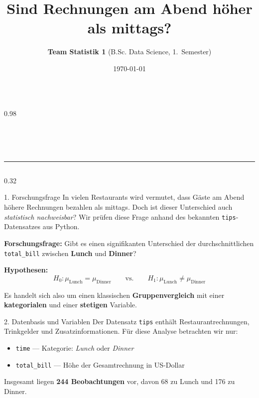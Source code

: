 \documentclass[final]{beamer}
\title{\bfseries Sind Rechnungen am Abend höher als mittags?}
\author{\textbf{Team Statistik 1} (B.Sc. Data Science, 1.\ Semester)}
\institute{\textbf{Technische Hochschule Ingolstadt – Fakultät Wirtschaftsingenieurwesen}}
\date{\today}
\newcommand{\smallgap}{\vspace{0.6cm}}
\begin{document}
\begin{frame}[t]

\begin{columns}[T]
  \begin{column}{0.98\textwidth}
    \vskip1cm
    \begin{center}
      {\Huge\inserttitle}\\[0.6cm]
      {\Large\insertauthor}\\[0.25cm]
      {\large\insertinstitute}\\[0.6cm]
      \rule{\textwidth}{1pt}
    \end{center}
  \end{column}
\end{columns}

\vspace{1cm}

\begin{columns}[T,totalwidth=\textwidth]

\begin{column}{0.32\textwidth}
  \begin{block}{1. Forschungsfrage}
    In vielen Restaurants wird vermutet, dass Gäste am Abend höhere Rechnungen bezahlen als mittags.  
    Doch ist dieser Unterschied auch \emph{statistisch nachweisbar}?  
    Wir prüfen diese Frage anhand des bekannten \texttt{tips}-Datensatzes aus Python.  

    \smallgap
    \textbf{Forschungsfrage:}  
    Gibt es einen signifikanten Unterschied der durchschnittlichen \texttt{total\_bill} zwischen \textbf{Lunch} und \textbf{Dinner}?  

    \smallgap
    \textbf{Hypothesen:}
    \[
      H_0: \mu_{\text{Lunch}} = \mu_{\text{Dinner}} 
      \qquad \text{vs.} \qquad 
      H_1: \mu_{\text{Lunch}} \neq \mu_{\text{Dinner}}
    \]

    \smallgap
    Es handelt sich also um einen klassischen \textbf{Gruppenvergleich} mit einer \textbf{kategorialen} und einer \textbf{stetigen} Variable.
  \end{block}

  \begin{block}{2. Datenbasis und Variablen}
    Der Datensatz \texttt{tips} enthält Restaurantrechnungen, Trinkgelder und Zusatzinformationen.  
    Für diese Analyse betrachten wir nur:
    \begin{itemize}
      \item \texttt{time} — Kategorie: \textit{Lunch} oder \textit{Dinner}
      \item \texttt{total\_bill} — Höhe der Gesamtrechnung in US-Dollar
    \end{itemize}
    Insgesamt liegen \textbf{244 Beobachtungen} vor, davon 68 zu Lunch und 176 zu Dinner.  


\end{block}
\end{column}
\end{columns}
\end{frame}
\end{document}
